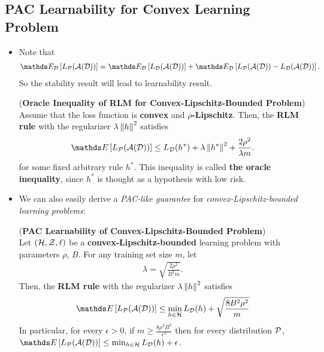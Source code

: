 \documentclass[11pt]{article}
\begin{document}
\subsection{PAC Learnability for Convex Learning Problem}
\begin{itemize}
\item Note that 
\begin{align*}
\E{\cD}{L_{\cP}(\cA(\cD))} = \E{\cD}{L_{\cD}(\cA(\cD))} + \E{\cD}{L_{\cP}(\cA(\cD)) - L_{\cD}(\cA(\cD)) }.
\end{align*} So the stability result will lead to learnability result.

\begin{corollary} (\textbf{Oracle Inequality of RLM for Convex-Lipschitz-Bounded Problem}) \citep{shalev2014understanding}\\
Assume that the loss function is \textbf{convex} and \textbf{$\rho$-Lipschitz}. Then, the \textbf{RLM rule} with the regularizer $\lambda\left\|h\right\|_{}^2$  satisfies
\begin{align}
\E{}{L_{\cP}(\cA(\cD))} \le L_{\cD}(h^{*}) + \lambda\norm{h^{*}}{}^2 + \frac{2\rho^2}{\lambda m}. \label{def: convex_lip_learnable_oracle}
\end{align} for some fixed arbitrary rule $h^{*}$. This inequality is called \textbf{the oracle inequality}, since $h^{*}$ is thought as a hypothesis
with low risk.
\end{corollary}

\item We can also easily derive a \emph{PAC-like guarantee} for \emph{convex-Lipschitz-bounded learning problems}:
\begin{corollary}(\textbf{PAC Learnability of Convex-Lipschitz-Bounded Problem}) \citep{shalev2014understanding}\\
Let  $({\mathcal H}, {\mathcal Z}, \ell)$ be a \textbf{convex-Lipschitz-bounded} learning problem with parameters $\rho$, $B$. For any training set size $m$, let 
\begin{align*}
\lambda = \sqrt{\frac{2\rho^2}{B^2 m}}.
\end{align*} Then, the \textbf{RLM rule} with the regularizer $\lambda\left\|h\right\|_{}^2$ satisfies
\begin{align}
\E{}{L_{\cP}(\cA(\cD))} \le \min_{h \in \cH}L_{\cD}(h) + \sqrt{\frac{8B^2 \rho^2}{m}}\label{def: convex_lip_learnable}
\end{align}
In particular, for every $\epsilon > 0$, if $m \ge \frac{8 \rho^2 B^2}{\epsilon^2}$ then for every distribution ${\mathcal P}$, $\E{}{L_{\cP}(\cA(\cD))} \le \min_{h \in \cH}L_{\cD}(h) + \epsilon$.
\end{corollary}


\end{itemize}
\end{document}
